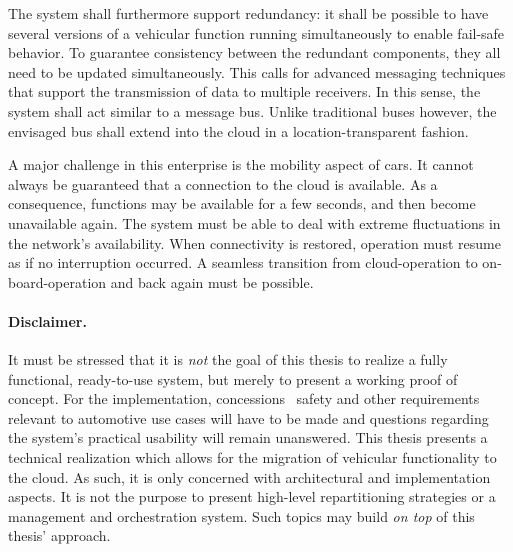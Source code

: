 The system shall furthermore support redundancy: it shall be possible to have several versions of a vehicular function running simultaneously to enable fail-safe behavior. To guarantee consistency between the redundant components, they all need to be updated simultaneously. This calls for advanced messaging techniques that support the transmission of data to multiple receivers.
In this sense, the system shall act similar to a message bus. Unlike traditional buses however, the envisaged bus shall extend into the cloud in a location-transparent fashion.

A major challenge in this enterprise is the mobility aspect of cars. It cannot always be guaranteed that a connection to the cloud is available. As a consequence, functions may be available for a few seconds, and then become unavailable again. The system must be able to deal with extreme fluctuations in the network's availability. When connectivity is restored, operation must resume as if no interruption occurred. A seamless transition from cloud-operation to on-board-operation and back again must be possible.

\paragraph{Disclaimer.}
It must be stressed that it is \emph{not} the goal of this thesis to realize a fully functional, ready-to-use system, but merely to present a working proof of concept. For the implementation, concessions \wrt\ safety and other requirements relevant to automotive use cases will have to be made and questions regarding the system's practical usability will remain unanswered. This thesis presents a technical realization which allows for the migration of vehicular functionality to the cloud. As such, it is only concerned with architectural and implementation aspects.
It is not the purpose to present high-level repartitioning strategies or a management and orchestration system. Such topics may build \emph{on top} of this thesis' approach.
%
%
%
%
%
%
%
%
%
%
